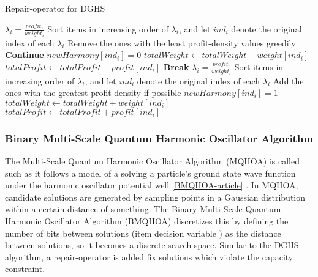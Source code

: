\documentclass[titlepage]{article}
\begin{document}
\vskip 0.5cm
\begin{breakablealgorithm}
\caption{Repair-operator for DGHS}\label{harmonyRepair}
    \begin{algorithmic}[1]
             \Comment{\textcolor{blue}{DROP phase}}
                \State $\lambda_{i} = \frac{profit_{i}}{weight_{i}}$
            \EndFor
            \State Sort items in increasing order of $\lambda_{i}$, and let $ind_{i}$ denote the original index of each $\lambda_{i}$
            \State Remove the ones with the least profit-density values greedily
                    \State \textbf{Continue}
                \EndIf
                \State $newHarmony[ind_{i}] = 0$ \Comment{\textcolor{blue}{Unload the item}}
                \State $totalWeight \gets totalWeight - weight[ind_{i}]$
                \State $totalProfit \gets totalProfit - profit[ind_{i}]$
                    \State \textbf{Break} \Comment{\textcolor{blue}{Terminate DROP phase}}
                \EndIf
            \EndFor
        \EndIf
             \Comment{\textcolor{blue}{ADD phase}}
                \State $\lambda_{i} = \frac{profit_{i}}{weight_{i}}$
            \EndFor
            \State Sort items in increasing order of $\lambda_{i}$, and let $ind_{i}$ denote the original index of each $\lambda_{i}$
                \State Add the ones with the greatest profit-density if possible 
                        \State $newHarmony[ind_{i}] = 1$
                        \State $totalWeight \gets totalWeight + weight[ind_{i}]$
                        \State $totalProfit \gets totalProfit + profit[ind_{i}]$
                    \EndIf
                \EndIf
            \EndFor
        \EndIf
    \end{algorithmic}
\end{breakablealgorithm}

\vskip 1cm
\subsubsection{Binary Multi-Scale Quantum Harmonic Oscillator Algorithm}

The Multi-Scale Quantum Harmonic Oscillator Algorithm (MQHOA) is called such as it follows a model of a solving a particle's ground state wave function under the harmonic oscillator potential well \ref{BMQHOA-article} . In MQHOA, candidate solutions are generated by sampling points in a Gaussian distribution within a certain distance of something. The Binary Multi-Scale Quantum Harmonic Oscillator Algorithm (BMQHOA) discretizes this by defining the number of bits between solutions (item decision variable ) as the distance between solutions, so it becomes a discrete search space. Similar to the DGHS algorithm, a repair-operator is added fix solutions which violate the capacity constraint. 
\end{document}
